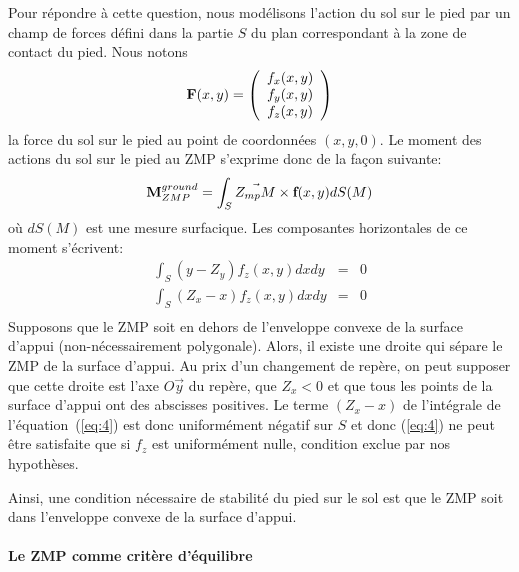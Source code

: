 Pour répondre à cette question, nous modélisons l'action du sol sur le
pied par un champ de forces défini dans la partie $S$ du plan
correspondant à la zone de contact du pied. Nous notons
$$
\textbf{F}(x,y) = \left(\begin{array}{c}
f_x(x,y) \\ f_y(x,y) \\ f_z(x,y)
\end{array}\right)
$$
la force du sol sur le pied au point de coordonnées $(x,y,0)$. Le moment des actions du sol sur le pied au
ZMP s'exprime donc de la façon suivante:
\begin{eqnarray*}
\textbf{M}^{ground}_{ZMP} = \int_S \vec{Z_{mp}M} \times \textbf{f}(x,y) dS(M)
\end{eqnarray*}
où $dS(M)$ est une mesure surfacique.
Les composantes horizontales de ce moment s'écrivent:
\begin{eqnarray}\label{eq:3}
  \int_S (y-Z_y)f_z(x,y) dx dy &=& 0 \\
  \label{eq:4}
  \int_S (Z_x-x)f_z(x,y) dx dy &=& 0 \\
\end{eqnarray}
Supposons que le ZMP soit en dehors de l'enveloppe convexe de la
surface d'appui (non-nécessairement polygonale). Alors, il existe une
droite qui sépare le ZMP de la surface d'appui. Au prix d'un
changement de repère, on peut supposer que cette droite est l'axe
$O\vec{y}$ du repère, que $Z_x < 0$ et que tous les points de la surface
d'appui ont des abscisses positives. Le terme $(Z_x-x)$ de l'intégrale
de l'équation~(\ref{eq:4}) est donc uniformément négatif sur $S$ et
donc (\ref{eq:4}) ne peut être satisfaite que si $f_z$ est
uniformément nulle, condition exclue par nos hypothèses.

Ainsi, une condition nécessaire de stabilité du pied sur le sol est
que le ZMP soit dans l'enveloppe convexe de la surface d'appui.


\paragraph{Le ZMP comme critère d'équilibre}

